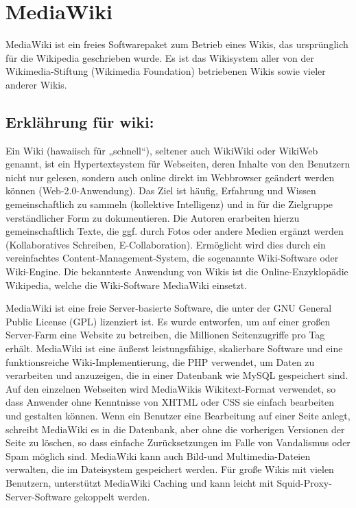 \section{MediaWiki}
MediaWiki ist ein freies Softwarepaket zum Betrieb eines Wikis, das ursprünglich für die Wikipedia geschrieben wurde. Es ist das Wikisystem aller von der Wikimedia-Stiftung (Wikimedia Foundation) betriebenen Wikis sowie vieler anderer Wikis.
\subsection{Erklährung für wiki:}
Ein Wiki (hawaiisch für „schnell“), seltener auch WikiWiki oder WikiWeb genannt, ist ein Hypertextsystem für Webseiten, deren Inhalte von den Benutzern nicht nur gelesen, sondern auch online direkt im Webbrowser geändert werden können (Web-2.0-Anwendung). Das Ziel ist häufig, Erfahrung und Wissen gemeinschaftlich zu sammeln (kollektive Intelligenz) und in für die Zielgruppe verständlicher Form zu dokumentieren. Die Autoren erarbeiten hierzu gemeinschaftlich Texte, die ggf. durch Fotos oder andere Medien ergänzt werden (Kollaboratives Schreiben, E-Collaboration). Ermöglicht wird dies durch ein vereinfachtes Content-Management-System, die sogenannte Wiki-Software oder Wiki-Engine. Die bekannteste Anwendung von Wikis ist die Online-Enzyklopädie Wikipedia, welche die Wiki-Software MediaWiki einsetzt.

MediaWiki ist eine freie Server-basierte Software, die unter der GNU General Public License (GPL) lizenziert ist. Es wurde entworfen, um auf einer großen Server-Farm eine Website zu betreiben, die Millionen Seitenzugriffe pro Tag erhält.
MediaWiki ist eine äußerst leistungsfähige, skalierbare Software und eine funktionsreiche Wiki-Implementierung, die PHP verwendet, um Daten zu verarbeiten und anzuzeigen, die in einer Datenbank wie MySQL gespeichert sind.
Auf den einzelnen Webseiten wird MediaWikis Wikitext-Format verwendet, so dass Anwender ohne Kenntnisse von XHTML oder CSS sie einfach bearbeiten und gestalten können.
Wenn ein Benutzer eine Bearbeitung auf einer Seite anlegt, schreibt MediaWiki es in die Datenbank, aber ohne die vorherigen Versionen der Seite zu löschen, so dass einfache Zurücksetzungen im Falle von Vandalismus oder Spam möglich sind. MediaWiki kann auch Bild-und Multimedia-Dateien verwalten, die im Dateisystem gespeichert werden. Für große Wikis mit vielen Benutzern, unterstützt MediaWiki Caching und kann leicht mit Squid-Proxy-Server-Software gekoppelt werden.

